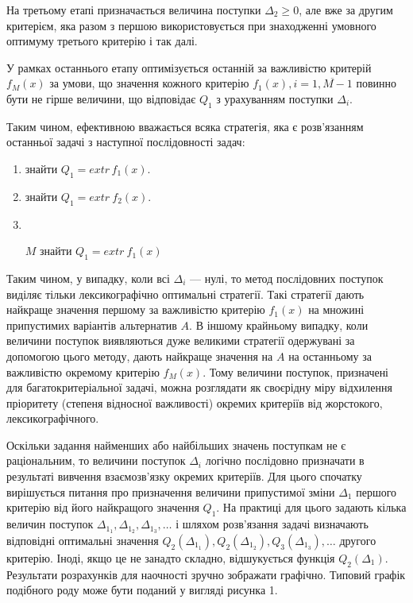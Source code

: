 На третьому етапі призначається величина поступки $\Delta_2 \geq 0$, але вже за другим критерієм, яка разом з першою використовується при знаходженні умовного оптимуму третього критерію і так далі. 

У рамках останнього етапу оптимізується останній за важливістю критерій $f_M(x)$ за умови, що значення кожного критерію $f_1(x), i=\overline{1, M-1}$ повинно бути не гірше величини, що відповідає $Q_1$ з урахуванням поступки $\Delta_i$.

Таким чином, ефективною вважається 	всяка стратегія, яка є розв'язанням останньої задачі з наступної послідовності задач:
\begin{enumerate}[label=\arabic*)]
	\item знайти $Q_1 = extr \, f_1(x) $.
	\item знайти $ Q_1 = extr_{} \, f_2(x)$.
	\item \noindent\dotfill
	\item[$M$] знайти $Q_1 = extr_{} \, f_1(x)$
\end{enumerate}

Таким чином, у випадку, коли всі $\Delta_i$ --- нулі, то метод послідовних поступок виділяє тільки лексикографічно оптимальні стратегії. 
Такі стратегії дають найкраще значення першому за важливістю критерію $f_1(x)$ на множині припустимих варіантів альтернатив $A$. 
В іншому крайньому випадку, коли величини поступок виявляються дуже великими стратегії одержувані за допомогою цього методу, дають найкраще значення на $A$ на останньому за важливістю окремому критерію $f_M(x)$. 
Тому величини поступок, призначені для багатокритеріальної задачі, можна розглядати як 	своєрідну міру відхилення пріоритету (степеня відносної важливості) окремих критеріїв від жорстокого, лексикографічного.

Оскільки задання найменших або найбільших значень поступкам не є раціональним, то величини поступок $\Delta_i$ логічно послідовно призначати в результаті вивчення взаємозв'язку окремих критеріїв. 
Для цього спочатку вирішується питання про призначення величини припустимої зміни $\Delta_1$ першого критерію від його найкращого значення $Q_1$. 
На практиці для цього задають кілька величин поступок $\Delta_{1}_{1}, \Delta_{1}_{2}, \Delta_{1}_{3}, \dotsc$ і шляхом розв'язання задачі визначають відповідні оптимальні значення $Q_2(\Delta_{1}_{1}), Q_2(\Delta_{1}_{2}), Q_3(\Delta_{1}_{3}), \dotsc$ другого критерію. 
Іноді, якщо це не занадто складно, відшукується функція $Q_2(\Delta_1)$. 
Результати розрахунків для наочності зручно зображати графічно. 
Типовий графік подібного роду може бути поданий у вигляді рисунка 1.

